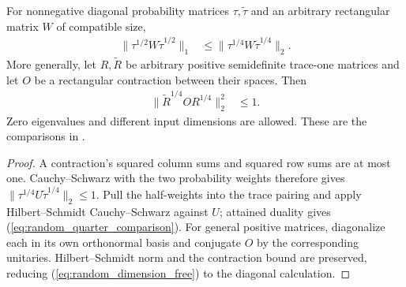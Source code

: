 \begin{theorem}
    \label{thm:random_quarter_weights}
    \leanok
    For nonnegative diagonal probability matrices $\tau,\widetilde\tau$
    and an arbitrary rectangular matrix $W$ of compatible size,
    \begin{align}
        \lVert\tau^{1/2}W\widetilde\tau^{1/2}\rVert_1
         & \leq\lVert\tau^{1/4}W\widetilde\tau^{1/4}\rVert_2.
        \label{eq:random_quarter_comparison}
    \end{align}
    More generally, let $R,\widetilde R$ be arbitrary positive
    semidefinite trace-one matrices and let $O$ be a rectangular
    contraction between their spaces. Then
    \begin{align}
        \lVert\widetilde R^{1/4}OR^{1/4}\rVert_2^2 & \leq1.
        \label{eq:random_dimension_free}
    \end{align}
    Zero eigenvalues and different input dimensions are allowed. These
    are the comparisons in
    \cite[Equations~(5.15) and~(5.17)]{OpenAI2026PolynomialPEPS}.
\end{theorem}

\begin{proof}\leanok
    A contraction's squared column sums and squared row sums are at most
    one. Cauchy--Schwarz with the two probability weights therefore gives
    $\lVert\tau^{1/4}U\widetilde\tau^{1/4}\rVert_2\leq1$.
    Pull the half-weights into the trace pairing and apply
    Hilbert--Schmidt Cauchy--Schwarz against $U$; attained duality gives
    (\ref{eq:random_quarter_comparison}). For general positive matrices,
    diagonalize each in its own orthonormal basis and conjugate $O$ by
    the corresponding unitaries. Hilbert--Schmidt norm and the
    contraction bound are preserved, reducing
    (\ref{eq:random_dimension_free}) to the diagonal calculation.
\end{proof}

